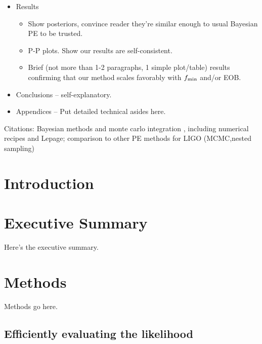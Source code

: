 \documentclass[twocolumn,prd,nofootinbib]{revtex4}
\begin{document}
\begin{widetext}
\begin{itemize}
\item Results
	\begin{itemize}
	\item Show posteriors, convince reader they're similar enough to usual Bayesian PE to be trusted.
	\item P-P plots. Show our results are self-consistent.
	\item Brief (not more than 1-2 paragraphs, 1 simple plot/table) results confirming 
		that our method scales favorably with $f_{\rm min}$ and/or EOB. 
	\end{itemize}

\item Conclusions -- self-explanatory.

\item Appendices -- Put detailed technical asides here.

\end{itemize}

Citations: Bayesian methods and monte carlo integration \cite{2011RvMP...83..943V}, including numerical recipes and Lepage; comparison
to other PE methods for LIGO
(MCMC,nested sampling) \cite{LIGO-CBC-S6-PE,2011PhRvD..83h2002D,2011PhRvD..84f2003C,gr-extensions-tests-Europeans2011,gwastro-mergers-PE-Aylott-LIGOATest,2011ApJ...739...99N,2012PhRvD..85j4045V,gw-astro-PE-Raymond,gw-astro-PE-lalinference-v1}

\tableofcontents

\end{widetext}

\section{Introduction}

\section{Executive Summary}

Here's the executive summary.

\section{Methods}

Methods go here.

\subsection{Efficiently evaluating the likelihood}
\end{document}
